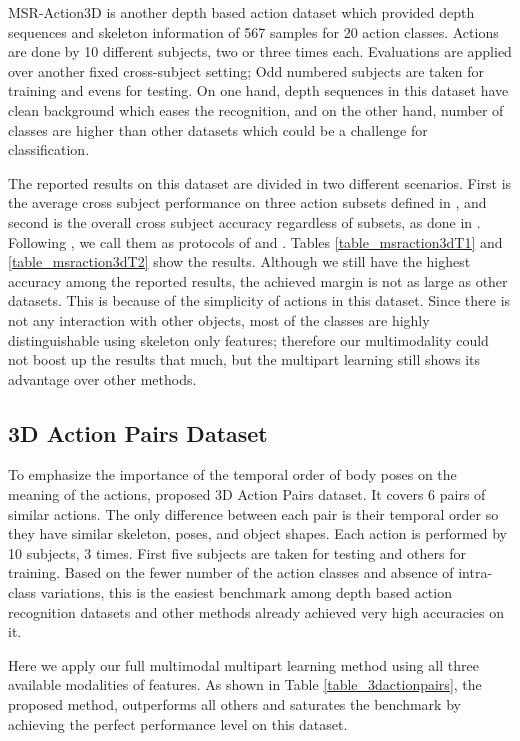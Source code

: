 \documentclass[9pt,technote,compsoc]{IEEEtran}
\begin{document}
MSR-Action3D \cite{msraction3ddataset} is another depth based action dataset which provided depth sequences and skeleton information of 567 samples for 20 action classes. Actions are done by 10 different subjects, two or three times each. Evaluations are applied over another fixed cross-subject setting; Odd numbered subjects are taken for training and evens for testing. On one hand, depth sequences in this dataset have clean background which eases the recognition, and on the other hand, number of classes are higher than other datasets which could be a challenge for classification.

The reported results on this dataset are divided in two different scenarios. First is the average cross subject performance on three action subsets defined in \cite{msraction3ddataset}, and second is the overall cross subject accuracy regardless of subsets, as done in \cite{actionletPAMI}. Following \cite{VemulapalliCVPR14}, we call them as protocols of \cite{msraction3ddataset} and \cite{actionletPAMI}. Tables \ref{table_msraction3dT1} and \ref{table_msraction3dT2} show the results. Although we still have the highest accuracy among the reported results, the achieved margin is not as large as other datasets. This is because of the simplicity of actions in this dataset. Since there is not any interaction with other objects, most of the classes are highly distinguishable using skeleton only features; therefore our multimodality could not boost up the results that much, but the multipart learning still shows its advantage over other methods. 


\subsection{3D Action Pairs Dataset}
To emphasize the importance of the temporal order of body poses on the meaning of the actions, \cite{HON4D} proposed 3D Action Pairs dataset. It covers 6 pairs of similar actions. The only difference between each pair is their temporal order so they have similar skeleton, poses, and object shapes. Each action is performed by 10 subjects, 3 times. First five subjects are taken for testing and others for training. Based on the fewer number of the action classes and absence of intra-class variations, this is the easiest benchmark among depth based action recognition datasets and other methods already achieved very high accuracies on it.

Here we apply our full multimodal multipart learning method using all three available modalities of features. As shown in Table \ref{table_3dactionpairs}, the proposed method, outperforms all others and saturates the benchmark by achieving the perfect performance level on this dataset.
\end{document}
